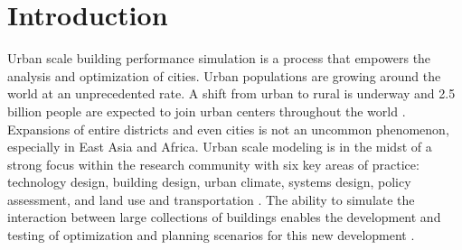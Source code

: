 \documentclass{tBPS2e}
\theoremstyle{plain}
\theoremstyle{definition}
\theoremstyle{remark}
\begin{document}

\linenumbers

\section{Introduction}

Urban scale building performance simulation is a process that empowers the analysis and optimization of cities. Urban populations are growing around the world at an unprecedented rate. A shift from urban to rural is underway and 2.5 billion people are expected to join urban centers throughout the world \citep{UnitedNations:2014vn}. Expansions of entire districts and even cities is not an uncommon phenomenon, especially in East Asia and Africa. Urban scale modeling is in the midst of a strong focus within the research community with six key areas of practice: technology design, building design, urban climate, systems design, policy assessment, and land use and transportation \citep{Keirstead:2012ct}. The ability to simulate the interaction between large collections of buildings enables the development and testing of optimization and planning scenarios for this new development \citep{Dorer:2013vt}. 
\end{document}
